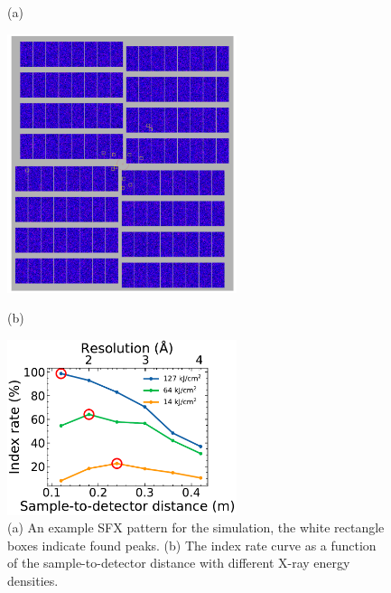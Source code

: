 \documentclass[11pt, a4paper]{article}
\begin{document}
\begin{figure}[H]
\centering
\begin{flushleft}
\LARGE{(a)}
\end{flushleft}
\includegraphics[width=0.6\textwidth]{figures/SFX_pattern.png} \\
\begin{flushleft}
\LARGE{(b)}
\end{flushleft}
\includegraphics[width=0.6\textwidth]{figures/index_rate.pdf} 
\caption 
{\label{fig:optSim}
(a) An example SFX pattern for the simulation, the white rectangle boxes indicate found peaks. (b) The index rate curve as a function of the sample-to-detector distance with different X-ray energy densities.} 
\end{figure}


% 
% 
\printbibliography
\end{document}
